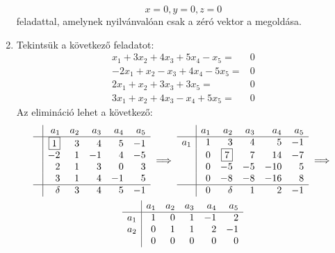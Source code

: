 \documentclass[a4paper, showtrims]{memoir}
\theoremstyle{plain}
\theoremstyle{remark}
\theoremstyle{definition}
\begin{document}
\begin{enumerate}
      \[x=0,y=0,z=0\]
	  feladattal, amelynek nyilvánvalóan csak a zéró vektor a megoldása.
	\item
	      Tekintsük a következő feladatot:
	      \[
		      \begin{array}{rl}
			      x_1+3x_2+4x_3+5x_4-x_5=  & 0 \\
			      -2x_1+x_2-x_3+4x_4-5x_5= & 0 \\
			      2x_1+x_2+3x_3+3x_5=      & 0 \\
			      3x_1+x_2+4x_3-x_4+5x_5=  & 0
		      \end{array}
	      \]
	      Az elimináció lehet a következő:
	      \begin{multline*}
		      \begin{array}{r|rrrrr}
			       & a_1       & a_2 & a_3 & a_4 & a_5 \\
			      \hline
			       & \boxed{1} & 3   & 4   & 5   & -1  \\
			       & -2        & 1   & -1  & 4   & -5  \\
			       & 2         & 1   & 3   & 0   & 3   \\
			       & 3         & 1   & 4   & -1  & 5   \\
			      \hline
			       & \delta    & 3   & 4   & 5   & -1
		      \end{array}
		      \implies
		      \begin{array}{r|rrrrr}
			          & a_1 & a_2       & a_3 & a_4 & a_5 \\
			      \hline
			      a_1 & 1   & 3         & 4   & 5   & -1  \\
			          & 0   & \boxed{7} & 7   & 14  & -7  \\
			          & 0   & -5        & -5  & -10 & 5   \\
			          & 0   & -8        & -8  & -16 & 8   \\
			      \hline
			          & 0   & \delta    & 1   & 2   & -1
		      \end{array}
		      \implies
		      \\
		      \begin{array}{r|rrrrr}
			          & a_1 & a_2 & a_3 & a_4 & a_5 \\
			      \hline
			      a_1 & 1   & 0   & 1   & -1  & 2   \\
			      a_2 & 0   & 1   & 1   & 2   & -1  \\
			          & 0   & 0   & 0   & 0   & 0   \\

\end{array}
\end{multline*}
\end{enumerate}
\end{document}
